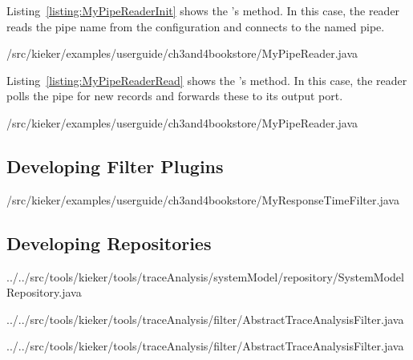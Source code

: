 \noindent Listing~\ref{listing:MyPipeReaderInit} shows the 's %
 method. In this case, the reader reads the pipe name from the %
configuration and connects to the named pipe. 

\setJavaCodeListing
%
{\customComponentsBookstoreApplicationDir/src/kieker/examples/userguide/ch3and4bookstore/MyPipeReader.java}

\noindent Listing~\ref{listing:MyPipeReaderRead} shows the 's %
 method. In this case, the reader polls the pipe for new records %
and forwards these to its output port. 

\setJavaCodeListing
%
{\customComponentsBookstoreApplicationDir/src/kieker/examples/userguide/ch3and4bookstore/MyPipeReader.java}


\subsection{Developing Filter Plugins}\label{sec:analysis:filters}

\setJavaCodeListing
%
{\customComponentsBookstoreApplicationDir/src/kieker/examples/userguide/ch3and4bookstore/MyResponseTimeFilter.java}

\subsection{Developing Repositories}

\setJavaCodeListing
%
{../../src/tools/kieker/tools/traceAnalysis/systemModel/repository/SystemModelRepository.java}

\setJavaCodeListing
%
{../../src/tools/kieker/tools/traceAnalysis/filter/AbstractTraceAnalysisFilter.java}

\setJavaCodeListing
%
{../../src/tools/kieker/tools/traceAnalysis/filter/AbstractTraceAnalysisFilter.java}


